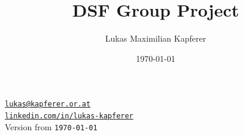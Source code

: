 \documentclass[a4paper, titlepage]{article} %
\title{DSF Group Project}
\author{Lukas Maximilian Kapferer}
\date{\today}
\begin{document}
\begin{titlepage}
    \centering
    \vspace*{3cm}
    {\LARGE \textbf{\thetitle} \par}
    \vspace{2cm}
    {\large \protect\theauthor\par}
    \vspace{0.5cm}
    \small
    \texttt{\href{mailto:lukas@kapferer.or.at}{lukas@kapferer.or.at}}\\
    \texttt{\href{https://www.linkedin.com/in/lukas-kapferer}{linkedin.com/in/lukas-kapferer}}\\
    \vspace{0.5cm}
    Version from \texttt{\today}
\end{titlepage}

\clearpage      %
\thispagestyle{empty} %
\tableofcontents
\listoffigures  %
\listoftables   %
\thispagestyle{plain}  %
\newpage
{} %




% 
% 

\end{document}
